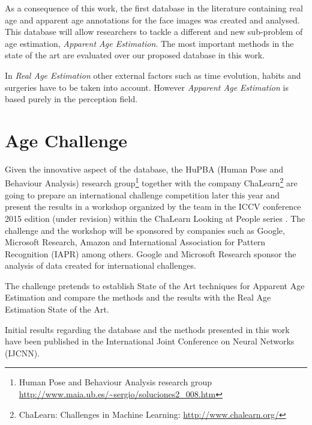 As a consequence of this work, the first database in the literature containing real age and apparent age annotations for the face images was created and analysed. This database will allow researchers to tackle a different and new sub-problem of age estimation, \textit{Apparent Age Estimation}. The most important methods in the state of the art are evaluated over our proposed database in this work.

In \textit{Real Age Estimation} other external factors such as time evolution, habits and surgeries have to be taken into account. However \textit{Apparent Age Estimation} is based purely in the perception field.


\section{Age Challenge}

Given the innovative aspect of the database, the HuPBA (Human Pose and Behaviour Analysis) research group\footnote{Human Pose and Behaviour Analysis research group\\ \url{http://www.maia.ub.es/~sergio/soluciones2_008.htm}} together with the company ChaLearn\footnote{ChaLearn: Challenges in Machine Learning: \url{http://www.chalearn.org/}} are going to prepare an international challenge competition later this year and present the results in a workshop organized by the team in the ICCV conference 2015 edition (under revision) within the ChaLearn Looking at People series \cite{LaP} \cite{SergioEscalera2014} \cite{Escalera:2013:MGR:2522848.2532595} \cite{conf/icmi/EscaleraGBRGAESASBS13}. The challenge and the workshop will be sponsored by companies such as Google, Microsoft Research, Amazon and International Association for Pattern Recognition (IAPR) among others. Google and Microsoft Research sponsor the analysis of data created for international challenges.

The challenge pretends to establish State of the Art techniques for Apparent Age Estimation and compare the methods and the results with the Real Age Estimation State of the Art.

Initial results regarding the database and the methods presented in this work have been published in the International Joint Conference on Neural Networks (IJCNN).


